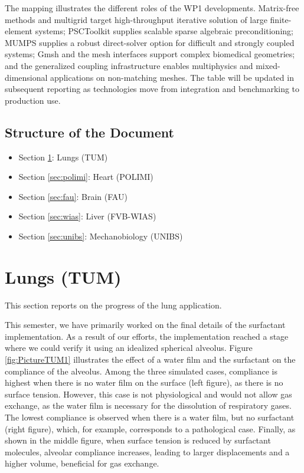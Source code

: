 \documentclass[a4paper,12pt]{article}
\begin{document}
The mapping illustrates the different roles of the WP1 developments.
Matrix-free methods and multigrid target high-throughput iterative solution
of large finite-element systems; PSCToolkit supplies scalable sparse
algebraic preconditioning; MUMPS supplies a robust direct-solver option for
difficult and strongly coupled systems; Gmsh and the mesh interfaces support
complex biomedical geometries; and the generalized coupling infrastructure
enables multiphysics and mixed-dimensional applications on non-matching
meshes. The table will be updated in subsequent reporting as technologies
move from integration and benchmarking to production use.

\subsection{{Structure of the Document}}
\begin{itemize}
    \item Section \ref{sec:tum}: Lungs (TUM)
    \item Section \ref{sec:polimi}: Heart (POLIMI)
    \item Section \ref{sec:fau}: Brain (FAU)
    \item Section \ref{sec:wias}: Liver (FVB-WIAS)
    \item Section \ref{sec:unibs}: Mechanobiology (UNIBS)
\end{itemize}

\newpage


\section{Lungs (TUM)}\label{sec:tum}

This section reports on the progress of the lung application.

This semester, we have primarily worked on the final details of the surfactant implementation. As a result of our efforts, the implementation reached a stage where we could verify it using an idealized spherical alveolus. Figure \ref{fig:PictureTUM1} illustrates the effect of a water film and the surfactant on the compliance of the alveolus. Among the three simulated cases, compliance is highest when there is no water film on the surface (left figure), as there is no surface tension. However, this case is not physiological and would not allow gas exchange, as the water film is necessary for the dissolution of respiratory gases. The lowest compliance is observed when there is a water film, but no surfactant (right figure), which, for example, corresponds to a pathological case. Finally, as shown in the middle figure, when surface tension is reduced by surfactant molecules, alveolar compliance increases, leading to larger displacements and a higher volume, beneficial for gas exchange.
\end{document}
